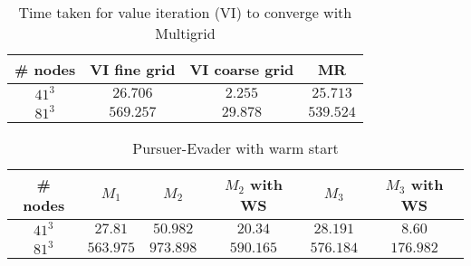 \begin{table}
\centering
\caption{Time taken for value iteration (VI) to converge with Multigrid}
\label{tab:vi_coarse_grid}
\begin{tabular}{|c| c| c| c| }
\hline
\# nodes & VI fine grid & VI coarse grid & MR \\ \hline
$41^3$ & $26.706$ & $2.255$ & $25.713$ \\ \hline
$81^3$ & $569.257$ & $29.878$ & $539.524$ \\ \hline
\end{tabular}
\end{table}

\begin{table}
\centering
\caption{Pursuer-Evader with warm start}
\label{tab:pursuer_evader}
\begin{tabular}{|c| c| c| c| c|c|}
\hline
\# nodes & $M_1$ & $M_2$ & $M_2$ with WS & $M_3$ & $M_3$ with WS \\ \hline
$41^3$ & $27.81$ & $50.982$ & $20.34$ & $28.191$ & $8.60$ \\ \hline
$81^3$ & $563.975$ & $973.898$ & $590.165$ & $576.184$ & $176.982$ \\ \hline
\end{tabular}
\end{table}